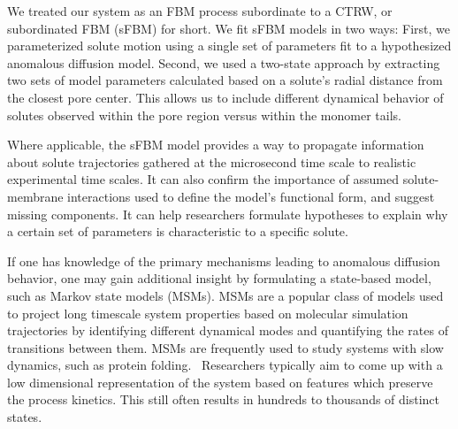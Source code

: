 \documentclass[aps,pre,preprint,groupedaddress]{revtex4-2}
\begin{document}
  We treated our system as an FBM process subordinate to a CTRW, or subordinated 
  FBM (sFBM) for short. We fit sFBM
  models in two ways: First, we parameterized solute motion using a single set of parameters fit
  to a hypothesized anomalous diffusion model. Second, we used a two-state approach
  by extracting two sets of model parameters calculated based on a solute's radial
  distance from the closest pore center. This allows us to include different dynamical
  behavior of solutes observed within the pore region versus within the monomer tails.
  
  Where applicable, the sFBM model provides a way to propagate information about
  solute trajectories gathered at the microsecond time scale to realistic experimental
  time scales. It can also confirm the importance of assumed solute-membrane interactions
  used to define the model's functional form, and suggest missing components. It
  can help researchers formulate hypotheses to explain why a certain set of parameters
  is characteristic to a specific solute.
  

  If one has knowledge of the primary mechanisms leading to anomalous diffusion behavior,
  one may gain additional insight by formulating a state-based model, such as Markov state
  models (MSMs). MSMs are a popular class of models used to project long timescale
  system properties based on molecular simulation trajectories by identifying
  different dynamical modes and quantifying the rates of transitions between them.
  MSMs are frequently used to study systems with slow dynamics, such as protein 
  folding.~\cite{snow_how_2005,chodera_automatic_2007} Researchers typically aim to 
  come up with a low dimensional representation of the system based on features 
  which preserve the process kinetics. This still often results in hundreds to thousands
  of distinct states.~\cite{chodera_markov_2014}
\end{document}
